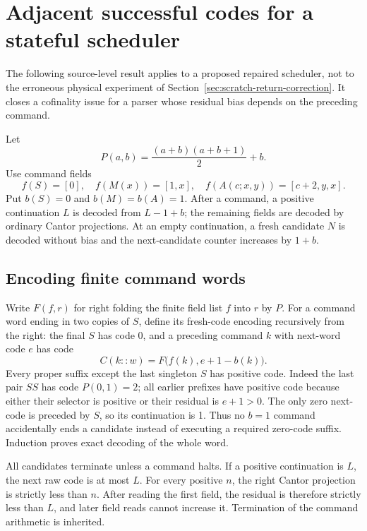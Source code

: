 \section{Adjacent successful codes for a stateful scheduler}
\label{sec:adjacent-success}

The following source-level result applies to a proposed repaired scheduler,
not to the erroneous physical experiment of
Section~\ref{sec:scratch-return-correction}.  It closes a cofinality issue
for a parser whose residual bias depends on the preceding command.

Let
\[
 P(a,b)=\frac{(a+b)(a+b+1)}2+b.
\]
Use command fields
\[
 f(S)=[0],\quad f(M(x))=[1,x],\quad
 f(A(c;x,y))=[c+2,y,x].
\]
Put $b(S)=0$ and $b(M)=b(A)=1$.  After a command, a positive continuation
$L$ is decoded from $L-1+b$; the remaining fields are decoded by ordinary
Cantor projections.  At an empty continuation, a fresh candidate $N$ is
decoded without bias and the next-candidate counter increases by $1+b$.

\subsection{Encoding finite command words}
Write $F(f,r)$ for right folding the finite field list $f$ into $r$ by $P$.
For a command word ending in two copies of $S$, define its fresh-code
encoding recursively from the right: the final $S$ has code 0, and a
preceding command $k$ with next-word code $e$ has code
\[
 C(k::w)=F\bigl(f(k),e+1-b(k)\bigr).
\]
Every proper suffix except the last singleton $S$ has positive code.
Indeed the last pair $SS$ has code $P(0,1)=2$; all earlier prefixes have
positive code because either their selector is positive or their residual
is $e+1>0$.  The only zero next-code is preceded by $S$, so its continuation
is 1.  Thus no $b=1$ command accidentally ends a candidate instead of
executing a required zero-code suffix.  Induction proves exact decoding of
the whole word.

All candidates terminate unless a command halts.  If a positive continuation
is $L$, the next raw code is at most $L$.  For every positive $n$, the right
Cantor projection is strictly less than $n$.  After reading the first field,
the residual is therefore strictly less than $L$, and later field reads
cannot increase it.  Termination of the command arithmetic is inherited.

